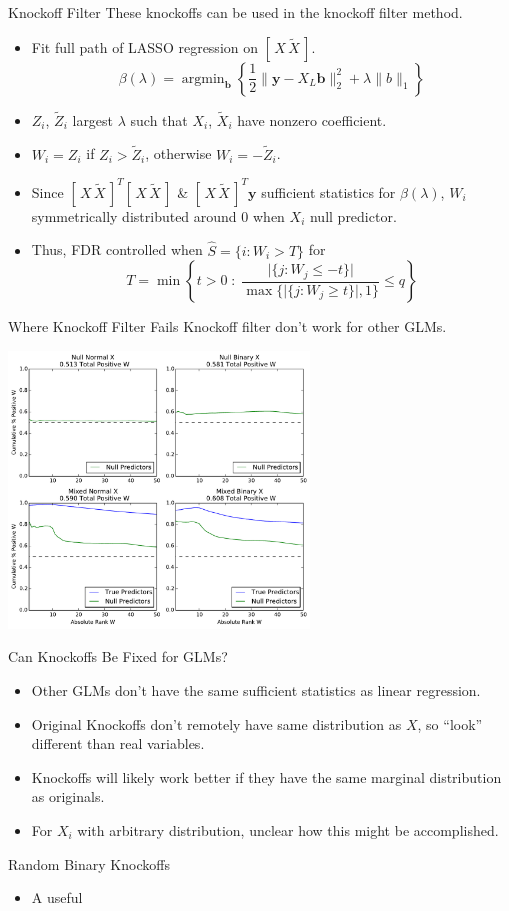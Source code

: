 \documentclass{beamer}
\DeclareMathOperator*{\argmin}{arg\min}
\begin{document}
\begin{frame}{Knockoff Filter}
    These knockoffs can be used in the knockoff filter method. 
    \begin{itemize}
        \item Fit full path of LASSO regression on $[\,X\,\tilde X\,]$.
    \[ \beta(\lambda) = \argmin_\mathbf b \left\{\frac{1}{2}\|\mathbf y - X_L\mathbf b\|^2_2 + \lambda\|b\|_1 \right\}\]
        \item $Z_i$, $\tilde Z_i$ largest $\lambda$ such that $X_i$, $\tilde X_i$ have nonzero coefficient.
        \item $W_i= Z_i$ if $Z_i>\tilde Z_i$, otherwise $W_i = -\tilde Z_i$.
        \item Since $[\, X \, \tilde X\,]^T[\, X \, \tilde X\,]$ \& $[\, X \, \tilde X\,]^T\mathbf y$ sufficient statistics for $\beta(\lambda)$, $W_i$ symmetrically distributed around $0$ when $X_i$ null predictor.
        \item Thus, FDR controlled when $\hat S = \{i:W_i>T\}$ for 
            \[ T = \min\left\{ t>0 \;: \; \frac{\vert\{j:W_j\leq -t\}\vert}{\max\{\vert\{j:W_j\geq t\}\vert,1\}}\leq q \right\} \]
    \end{itemize}
\end{frame}

\begin{frame}{Where Knockoff Filter Fails}
    Knockoff filter don't work for other GLMs. \\
    \begin{center}
        \includegraphics[width=8cm]{images/entryrate_original_logit}
    \end{center}
\end{frame}

\begin{frame}{Can Knockoffs Be Fixed for GLMs?}
    \begin{itemize}
        \item Other GLMs don't have the same sufficient statistics as linear regression.
        \item Original Knockoffs don't remotely have same distribution as $X$, so ``look'' different than real variables.
        \item Knockoffs will likely work better if they have the same marginal distribution as originals. 
        \item For $X_i$ with arbitrary distribution, unclear how this might be accomplished.
    \end{itemize}
\end{frame}

\begin{frame}{Random Binary Knockoffs}
    \begin{itemize}
        \item A useful 
    \end{itemize}
\end{frame}
\end{document}
